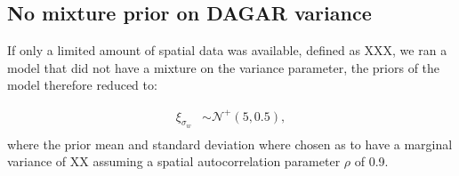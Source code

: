 \documentclass[
]{article}
\begin{document}
\hypertarget{no-mixture-prior-on-dagar-variance}{%
\subsection{No mixture prior on DAGAR variance}\label{no-mixture-prior-on-dagar-variance}}

If only a limited amount of spatial data was available, defined as XXX, we ran a model that did not have a mixture on the variance parameter, the priors of the model therefore reduced to:

\[
\begin{aligned}
\xi_{\sigma_w} & \sim \mathcal{N}^+(5, 0.5),\\
\end{aligned}
\]
where the prior mean and standard deviation where chosen as to have a marginal variance of XX assuming a spatial autocorrelation parameter \(\rho\) of 0.9.

\printbibliography[title=References]
\end{document}

